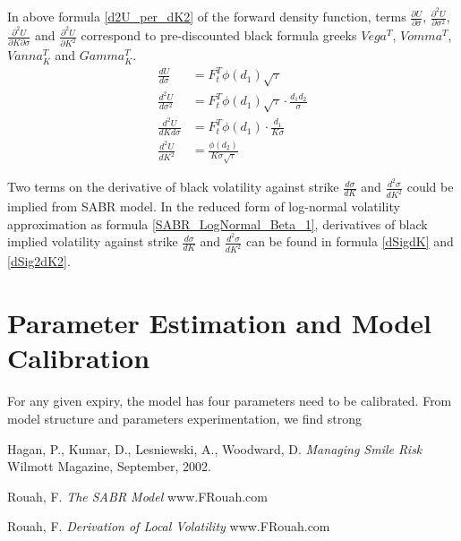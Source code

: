\documentclass{article}
\begin{document}
In above formula \ref{d2U_per_dK2} of the forward density function, terms $ \frac{\partial U}{\partial \sigma} $, $ \frac{\partial^2 U}{\partial \sigma^2} $, $ \frac{\partial^2 U}{\partial K \partial \sigma} $ and $ \frac{\partial^2 U}{\partial K^2} $ correspond to pre-discounted black formula greeks $ Vega^T $, $ Vomma^T $, $ Vanna_{K}^T $ and $ Gamma_{K}^T $.
\begin{subequations}
    \begin{align}
        \frac{d U}{d \sigma} &= F_{t}^{T} \phi(d_1) \sqrt{\tau} \\
        \frac{d^2 U}{d \sigma^2} &= F_{t}^{T} \phi(d_1) \sqrt{\tau} \cdot \frac{d_1 d_2}{\sigma} \\
        \frac{d^2 U}{d K d \sigma} &= F_{t}^{T} \phi(d_1) \cdot \frac{d_1}{K \sigma} \\
        \frac{d^2 U}{d K^2} &= \frac{\phi(d_2)}{K \sigma \sqrt{\tau}}
    \end{align}
\end{subequations}

Two terms on the derivative of black volatility against strike $ \frac{d \sigma}{d K} $ and $ \frac{d^2 \sigma}{d K^2} $ could be implied from SABR model.
In the reduced form of log-normal volatility approximation as formula \ref{SABR_LogNormal_Beta_1}, derivatives of black implied volatility against strike $ \frac{d \sigma}{d K} $ and $ \frac{d^2 \sigma}{d K^2} $ can be found in formula \ref{dSigdK} and \ref{dSig2dK2}.


\section{Parameter Estimation and Model Calibration}

For any given expiry, the model has four parameters need to be calibrated.
From model structure and parameters experimentation, we find strong


\begin{thebibliography}{9}
    Hagan, P., Kumar, D., Lesniewski, A., Woodward, D.
    \textit{Managing Smile Risk}
    Wilmott Magazine, September, 2002.
    
    Rouah, F.
    \textit{The SABR Model}
    www.FRouah.com
    
    Rouah, F.
    \textit{Derivation of Local Volatility}
    www.FRouah.com
\end{thebibliography}
\end{document}
